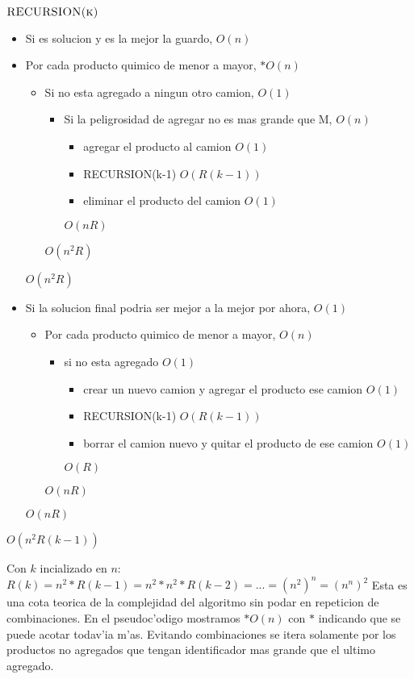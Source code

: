 $\textnormal{\scshape RECURSION(k)}$
\begin{itemize}
\item Si es solucion y es la mejor la guardo,						$O(n)$
\item Por cada producto quimico de menor a mayor, 						$*O(n)$
	\begin{itemize}
	\item Si no esta agregado a ningun otro camion,						$O(1)$			
		\begin{itemize}
		\item Si la peligrosidad de agregar no es mas grande que M,		$O(n)$
			\begin{itemize}
			\item agregar el producto al camion							$O(1)$
			\item RECURSION(k-1)											$O(R(k-1))$
			\item eliminar el producto del camion							$O(1)$
			\end{itemize}													$O(nR)$
		\end{itemize}													$O(n^2R)$
	\end{itemize}															$O(n^2R)$
\item Si la solucion final podria ser mejor a la mejor por ahora,				$O(1)$
	\begin{itemize}
	\item Por cada producto quimico de menor a mayor,								$O(n)$
		\begin{itemize}
		\item si no esta agregado													$O(1)$
			\begin{itemize}
			\item crear un nuevo camion y agregar el producto ese camion			$O(1)$
			\item RECURSION(k-1)													$O(R(k-1))$
			\item borrar el camion nuevo y quitar el producto de ese camion		$O(1)$
			\end{itemize}						$O(R)$
		\end{itemize}						$O(nR)$
	\end{itemize}						$O(nR)$
\end{itemize}	$O(n^2R(k-1))$


\linebreak
\linebreak

Con $k$ incializado en $n$:
$R(k) = n^2*R(k-1) = n^2*n^2*R(k-2) = ... = (n^2)^n = (n^n)^2$
Esta es una cota teorica de la complejidad del algoritmo sin podar en repeticion de combinaciones. 
En el pseudoc'odigo mostramos $*O(n)$ con $*$ indicando que se puede acotar todav'ia m'as. Evitando combinaciones se itera solamente por los productos no agregados que tengan identificador mas grande que el ultimo agregado.


